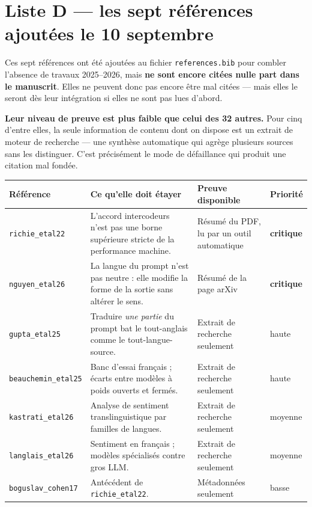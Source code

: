 \documentclass[11pt,a4paper]{article}
\newcommand{\cle}[1]{\texttt{\small #1}}
\begin{document}
\section{Liste D --- les sept références ajoutées le 10 septembre}
\label{sec:D}

Ces sept références ont été ajoutées au fichier \cle{references.bib} pour
combler l'absence de travaux 2025--2026, mais \textbf{ne sont encore citées
nulle part dans le manuscrit}. Elles ne peuvent donc pas encore être mal
citées --- mais elles le seront dès leur intégration si elles ne sont pas lues
d'abord.

\medskip
\noindent\textbf{Leur niveau de preuve est plus faible que celui des 32 autres.}
Pour cinq d'entre elles, la seule information de contenu dont on dispose est un
extrait de moteur de recherche --- une synthèse automatique qui agrège plusieurs
sources sans les distinguer. C'est précisément le mode de défaillance qui
produit une citation mal fondée.

\begin{center}
\small
\begin{tabular}{@{}p{3.3cm}p{5.4cm}p{3.1cm}p{2.6cm}@{}}
\toprule
\textbf{Référence} & \textbf{Ce qu'elle doit étayer} & \textbf{Preuve
disponible} & \textbf{Priorité} \\
\midrule
\cle{richie\_etal22} &
L'accord intercodeurs n'est pas une borne supérieure stricte de la performance
machine. &
Résumé du PDF, lu par un outil automatique &
\textbf{critique} \\[1.5mm]
\cle{nguyen\_etal26} &
La langue du prompt n'est pas neutre : elle modifie la forme de la sortie sans
altérer le sens. &
Résumé de la page arXiv &
\textbf{critique} \\[1.5mm]
\cle{gupta\_etal25} &
Traduire \emph{une partie} du prompt bat le tout-anglais comme le
tout-langue-source. &
Extrait de recherche seulement &
haute \\[1.5mm]
\cle{beauchemin\_etal25} &
Banc d'essai français ; écarts entre modèles à poids ouverts et fermés. &
Extrait de recherche seulement &
haute \\[1.5mm]
\cle{kastrati\_etal26} &
Analyse de sentiment translinguistique par familles de langues. &
Extrait de recherche seulement &
moyenne \\[1.5mm]
\cle{langlais\_etal26} &
Sentiment en français ; modèles spécialisés contre gros LLM. &
Extrait de recherche seulement &
moyenne \\[1.5mm]
\cle{boguslav\_cohen17} &
Antécédent de \cle{richie\_etal22}. &
Métadonnées seulement &
basse \\
\bottomrule
\end{tabular}
\end{center}
\end{document}
